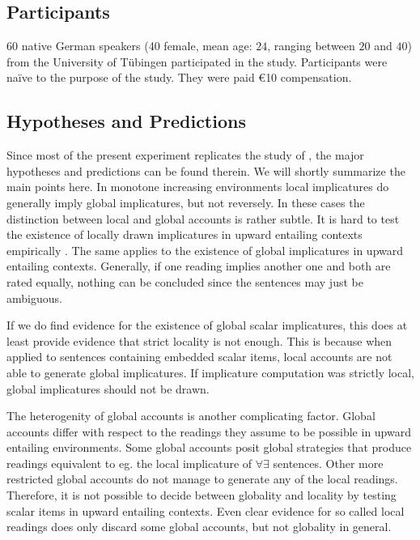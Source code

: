 \documentclass[a4paper,10pt]{article}
\begin{document}
\subsection{Participants}
60 native German speakers (40 female, mean age: $24$, ranging between $20$ and $40$) from the University of T{\"u}bingen participated in the study. Participants were na\"ive to the purpose of the study. They were paid \euro{10} compensation. 

\subsection{Hypotheses and Predictions}
Since most of the present experiment replicates the study of , the major hypotheses and predictions can be found therein. We will shortly summarize the main points here. In monotone increasing environments local implicatures do generally imply global implicatures, but not reversely.  In these cases the distinction between local and global accounts is rather subtle. It is hard to test the existence of locally drawn implicatures in upward entailing contexts empirically . The same applies to the existence of global implicatures in upward entailing contexts. Generally, if one reading implies another one and both are rated equally, nothing can be concluded since the sentences may just be ambiguous.

If we do find evidence for the existence of global scalar implicatures, this does at least provide evidence that strict locality is not enough. This is because when applied to sentences containing embedded scalar items, local accounts are not able to generate global implicatures. If implicature computation was strictly local, global implicatures should not be drawn. 

The heterogenity of global accounts is another complicating factor.  Global accounts differ with respect to the readings they assume to be possible in upward entailing environments. Some global accounts  posit global strategies that produce readings equivalent to eg. the local implicature of $\forall \exists$ sentences. Other more restricted global accounts do not manage to generate any of the local readings. Therefore, it is not possible to decide between globality and locality by testing scalar items in upward entailing contexts. Even clear evidence for so called local readings does only discard some global accounts, but not globality in general. 
\end{document}
